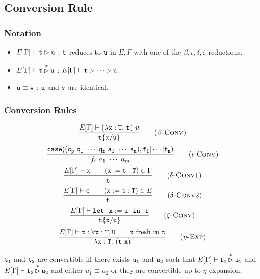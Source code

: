 \subsection{Conversion Rule}

\subsubsection{Notation}
\begin{itemize}
    \item $E[\Gamma]\vdash \tt t\rhd u$ : $\tt t$ reduces to $\tt u$ in $E,\Gamma$ with 
    one of the $\beta,\iota,\delta,\zeta$ reductions.
    \item $E[\Gamma]\vdash \tt t\mathop{\rhd}\limits^* u$ : $E[\Gamma]\vdash\tt t\rhd\cdots\rhd u$.
    \item $\tt u\equiv v$ : $\tt u$ and $\tt v$ are identical.
\end{itemize}

\subsubsection{Conversion Rules}
\begin{equation*}
\frac{E[\Gamma]\vdash(\lambda{\tt x:T.\ t})\ u}
    {\tt t\{x/u\}}
    \tag{\sc $\beta$-Conv}
\end{equation*}
\begin{equation*}
\frac{\tt case((c_p\ q_1\ \cdots\ q_r\ a_1\ \cdots\ a_m),f_1|\cdots|f_n)}
    {f_i\ a_1\ \cdots\ a_m}
    \tag{\sc $\iota$-Conv}
\end{equation*}
\begin{equation*}
\frac{E[\Gamma]\vdash{\tt x}\qquad ({\tt x:=t:T})\in\Gamma}
    {\tt t}
    \tag{\sc $\delta$-Conv1}
\end{equation*}
\begin{equation*}
\frac{E[\Gamma]\vdash{\tt c}\qquad ({\tt x:=t:T})\in E}
    {\tt t}
    \tag{\sc $\delta$-Conv2}
\end{equation*}
\begin{equation*}
\frac{E[\Gamma]\vdash \tt let\ \ x:=u\ \ in\ \ t}
    {\tt t\{x/u\}}
    \tag{\sc $\zeta$-Conv}
\end{equation*}
\begin{equation*}
\frac{E[\Gamma]\vdash \tt t:\forall x:T,U\qquad x\text{ fresh in }t}
    {\tt \lambda\tt x:T.\ (t\ x)}
    \tag{\sc $\eta$-Exp}
\end{equation*}

\begin{Def}[Convertibility]
$\tt t_1$ and $\tt t_2$ are convertible iff there exists $\tt u_1$ and $\tt u_2$ such that 
$E[\Gamma]\vdash \tt t_1\mathop{\rhd}\limits^* u_1$ and $E[\Gamma]\vdash \tt t_2\mathop{\rhd}\limits^* u_2$ 
and either $u_1\equiv u_2$ or they are convertible up to $\eta$-expansion.
\end{Def}

